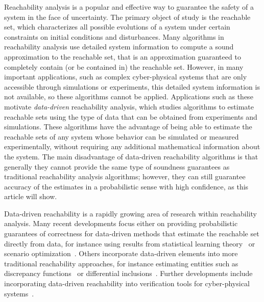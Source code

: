\documentclass[onefignum,onetabnum]{siamart171218}
\begin{document}
Reachability analysis is a popular and effective way to guarantee the safety of a system
in the face of uncertainty. The primary object of study is
the reachable set, which characterizes all possible evolutions of a system under
certain constraints on initial conditions and disturbances.
Many algorithms in reachability analysis use detailed
system information to compute a sound approximation to the reachable set, that
is an approximation guaranteed to completely contain (or be contained in) the
reachable set. However,
in many important applications, such as 
complex
cyber-physical systems that
are only accessible through simulations or experiments, this detailed
system information is not available, so these algorithms cannot be applied.
Applications such as these motivate \emph{data-driven} reachability analysis,
which studies algorithms to estimate reachable sets using the type of data that
can be obtained from experiments and simulations. These algorithms have the
advantage of being able to estimate the reachable sets of any system whose
behavior can be simulated or measured experimentally, without requiring any
additional mathematical information about the system. The main disadvantage of
data-driven reachability algorithms is that generally they cannot provide the
same type of soundness guarantees as traditional reachability analysis
algorithms; however, they can still guarantee accuracy of the estimates in a
probabilistic sense with high confidence, as this article will show.

Data-driven reachability is a rapidly growing area of research within
reachability analysis. Many recent developments focus either on providing probabilistic
guarantees of correctness for data-driven methods that estimate the reachable
set directly from data,
for instance using results from statistical learning theory~\cite{devonport2020data} or scenario
optimization~\cite{marseglia2014hybrid,yang2016multi,ioli2017smart,sartipizadeh2019voronoi,hewing2019scenario,devonport2020estimating}. 
Others incorporate data-driven elements into more traditional reachability
approaches, for instance estimating entities such as discrepancy
functions~\cite{fan2017dryvr} or
differential inclusions~\cite{djeumou2020fly}. Further developments include incorporating
data-driven reachability into verification tools for
cyber-physical systems~\cite{fan2017dryvr, qi2018dryvr}.
\end{document}
